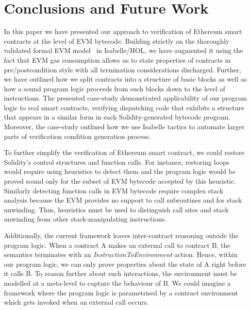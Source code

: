 \documentclass[sigplan,10pt,review]{acmart}\settopmatter{printfolios=true,printccs=false,printacmref=false}
\begin{document}

\section{Conclusions and Future Work}
\label{sec:concl}
In this paper we have presented our approach to verification of Ethereum smart contracts
at the level of EVM bytecode. Building strictly on the thoroughly validated formal EVM model~\cite{Yoichi} in Isabelle/HOL,
we have augmented it using the fact that EVM gas consumption allows us to state properties of contracts in pre/postcondition style
with all termination considerations discharged. Further, we have outlined how we split contracts into a
structure of basic blocks as well as how a sound program logic proceeds from such blocks down to the level of instructions. 
The presented case-study
demonstrated applicability of our program logic to real smart contracts, verifying dispatching code that exhibits a structure
that appears in a similar form
in each Solidity-generated bytecode program. 
Moreover, the case-study outlined how we use Isabelle tactics to automate
larger parts of verification condition generation process.

To further simplify the verification of Ethereum smart contract, we
could restore Solidity's control structures and function calls.
For instance, restoring loops would require using heuristics
to detect them and the program logic would be proved sound only
for the subset of EVM bytecode accepted by this heuristic.
Similarly detecting function calls in EVM bytecode require
complex stack analysis because the EVM provides no support to call
subroutines and for stack unwinding.
Thus, heuristics must be used to distinguish call sites and
stack unwinding from other stack-manipulating instructions.

Additionally, the current framework leaves inter-contract
reasoning outside the program logic.
When a contract A makes an external call to contract B,
the semantics terminates with an \textit{InstructionToEnvironment} action.
Hence, within our program logic, we can only prove properties
about the state of A right before it calls B.
To reason further about such interactions, the environment
must be modelled at a meta-level to capture the behaviour of B.
We could imagine a framework where the program logic is parametrised
by a contract environment which gets invoked when an external
call occurs.
\end{document}
